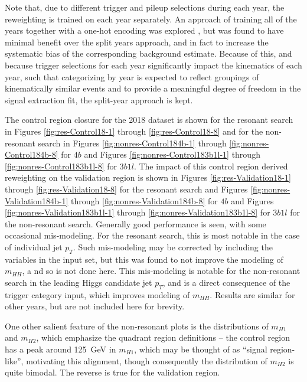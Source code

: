Note that, due to different trigger and pileup selections during each year, 
the reweighting is trained on each year separately. An approach of training all of the years 
together with a one-hot encoding was explored , but was found to have minimal 
benefit over the split years approach, and in fact to increase 
the systematic bias of the corresponding background estimate.
Because of this, and because trigger selections for each year significantly impact the kinematics of each year, 
such that categorizing by year is expected to reflect groupings of kinematically similar events and 
to provide a meaningful degree of freedom in the signal extraction fit, the split-year approach is
kept.

The control region closure for the 2018 dataset is shown for the resonant search in Figures \ref{fig:res-Control18-1} 
through \ref{fig:res-Control18-8} and for the non-resonant search in Figures \ref{fig:nonres-Control184b-1} 
through \ref{fig:nonres-Control184b-8} for $4b$ and Figures \ref{fig:nonres-Control183b1l-1} 
through \ref{fig:nonres-Control183b1l-8} for $3b1l$. The impact of this control 
region derived reweighting on the validation region is shown in Figures \ref{fig:res-Validation18-1} 
through \ref{fig:res-Validation18-8} for the resonant search and Figures \ref{fig:nonres-Validation184b-1} 
through \ref{fig:nonres-Validation184b-8} for $4b$ and Figures \ref{fig:nonres-Validation183b1l-1} 
through \ref{fig:nonres-Validation183b1l-8} for $3b1l$ for the non-resonant 
search. Generally good performance is seen, with some occasional mis-modeling. For the resonant 
search, this is most notable in the case of individual jet $p_{T}$. Such mis-modeling may be corrected 
by including the variables in the input set, but this was found to not improve the modeling of $m_{HH}$, a
nd so is not done here. This mis-modeling is notable for the non-resonant search in the leading Higgs candidate 
jet $p_{T}$, and is a direct consequence of the trigger category input, which improves modeling of $m_{HH}$.
Results are similar for other years, but are not included here for brevity. 

One other salient feature of the non-resonant plots is the distributions of $m_{H1}$ and $m_{H2}$, which 
emphasize the quadrant region definitions -- the control region has a peak around \SI{125}{\GeV} in $m_{H1}$, 
which may be thought of as ``signal region-like'', motivating this alignment, though consequently the 
distribution of $m_{H2}$ is quite bimodal. The reverse is true for the validation region.

